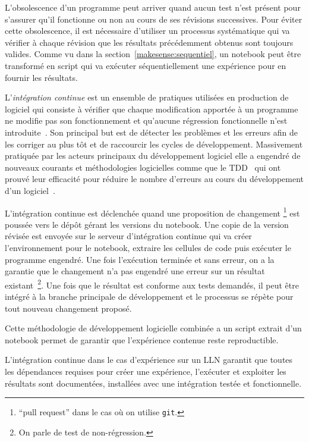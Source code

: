 L'obsolescence d'un programme peut arriver quand aucun test n'est présent pour s'assurer qu'il fonctionne ou non au cours de ses révisions successives.
Pour éviter cette obsolescence, il est nécessaire d'utiliser un processus systématique qui va vérifier à chaque révision que les résultats précédemment obtenus sont toujours valides.
Comme vu dans la section~\ref{makesense:sequentiel}, un notebook peut être transformé en script qui va exécuter séquentiellement une expérience pour en fournir les résultats.

L'\emph{intégration continue} est un ensemble de pratiques utilisées en production de logiciel qui consiste à vérifier que chaque modification apportée à un programme ne modifie pas son fonctionnement et qu'aucune régression fonctionnelle n'est introduite~\cite{duvall2007continuous}.
Son principal but est de détecter les problèmes et les erreurs afin de les corriger au plus tôt et de raccourcir les cycles de développement.
Massivement pratiquée par les acteurs principaux du développement logiciel elle a engendré de nouveaux courants et méthodologies logicielles comme que le \ac{TDD}~\cite{beck2003test} qui ont prouvé leur efficacité pour réduire le nombre d'erreurs au cours du développement d'un logiciel~\cite{maximilien2003assessing}. 

L'intégration continue est déclenchée quand une proposition de changement \footnote{``pull request'' dans le cas où on utilise \texttt{git}.} est poussée vers le dépôt gérant les versions du notebook.
Une copie de la version révisée est envoyée sur le serveur d'intégration continue qui va créer l'environnement pour le notebook, extraire les cellules de code puis exécuter le programme engendré.
Une fois l'exécution terminée et sans erreur, on a la garantie que le changement n'a pas engendré une erreur sur un résultat existant~\footnote{On parle de test de non-régression.}.
Une fois que le résultat est conforme aux tests demandés, il peut être intégré à la branche principale de développement et le processus se répète pour tout nouveau changement proposé.

Cette méthodologie de développement logicielle combinée a un script extrait d'un notebook permet de garantir que l'expérience contenue reste reproductible.

L'intégration continue dans le cas d'expérience sur un \ac{LLN} garantit que toutes les dépendances requises pour créer une expérience, l'exécuter et exploiter les résultats sont documentées, installées avec une intégration testée et fonctionnelle.

